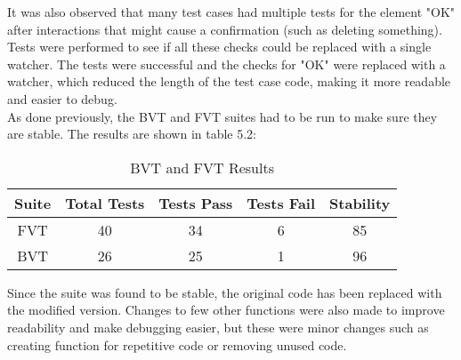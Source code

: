 It was also observed that many test cases had multiple tests for the element "OK" after interactions that might cause a confirmation (such as deleting something). Tests were performed to see if all these checks could be replaced with a single watcher. The tests were successful and the checks for "OK" were replaced with a watcher, which reduced the length of the test case code, making it more readable and easier to debug.\\

As done previously, the BVT and FVT suites had to be run to make sure they are stable. The results are shown in table 5.2:

\begin{table}[!h]
\centering
\caption{BVT and FVT Results}
\begin{tabular}{|c|c|c|c|c|}
\hline
Suite & Total Tests & Tests Pass & Tests Fail & Stability \\ \hline
FVT   & 40          & 34         & 6          & 85        \\ \hline
BVT   & 26          & 25         & 1          & 96       \\ \hline         
\end{tabular}
\end{table} 

Since the suite was found to be stable, the original code has been replaced with the modified version. Changes to few other functions were also made to improve readability and make debugging easier, but these were minor changes such as creating function for repetitive code or removing unused code.

